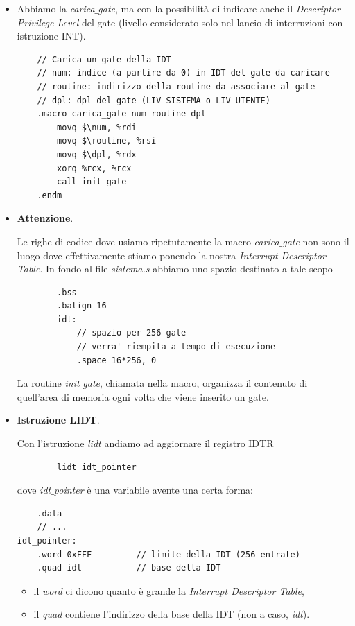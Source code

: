 \documentclass[11pt]{report}
\theoremstyle{definition}
\begin{document}
\normalsize 
\begin{itemize}
	\item Abbiamo la \emph{carica$\_$gate}, ma con la possibilità di indicare anche il \emph{Descriptor Privilege Level} del gate (livello considerato solo nel lancio di interruzioni con istruzione INT). 
	\small
	\begin{verbatim}
	// Carica un gate della IDT
	// num: indice (a partire da 0) in IDT del gate da caricare
	// routine: indirizzo della routine da associare al gate
	// dpl: dpl del gate (LIV_SISTEMA o LIV_UTENTE)
	.macro carica_gate num routine dpl
	    movq $\num, %rdi
	    movq $\routine, %rsi
	    movq $\dpl, %rdx
	    xorq %rcx, %rcx
	    call init_gate
	.endm
	\end{verbatim} 
	\normalsize
		\item \textbf{Attenzione}.
	
	Le righe di codice dove usiamo ripetutamente la macro \emph{carica$\_$gate} non sono il luogo dove effettivamente stiamo ponendo la nostra \emph{Interrupt Descriptor Table}. In fondo al file \emph{sistema.s} abbiamo uno spazio destinato a tale scopo
	\small
	\begin{verbatim}
		.bss
		.balign 16
		idt:
		    // spazio per 256 gate
		    // verra' riempita a tempo di esecuzione
		    .space 16*256, 0
	\end{verbatim}
	\normalsize
	La routine \emph{init$\_$gate}, chiamata nella macro, organizza il contenuto di quell'area di memoria ogni volta che viene inserito un gate.
	
	\item \textbf{Istruzione LIDT}.
	
	Con l'istruzione \emph{lidt} andiamo ad aggiornare il registro IDTR 
	\begin{verbatim}
		lidt idt_pointer
	\end{verbatim}
	dove \emph{idt$\_$pointer} è una variabile avente una certa forma:
	\small
	\begin{verbatim}
	.data
	// ...
idt_pointer:
    .word 0xFFF			// limite della IDT (256 entrate)
    .quad idt			// base della IDT
	\end{verbatim}
	\normalsize 
	\begin{itemize}
		\item il \emph{word} ci dicono quanto è grande la \emph{Interrupt Descriptor Table},
		\item il \emph{quad} contiene l'indirizzo della base della IDT (non a caso, \emph{idt}).
	\end{itemize}


\end{itemize}
\end{document}
